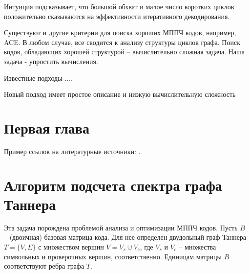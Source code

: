 \documentclass[specification,annotation,times]{itmo-student-thesis}
\begin{document}

\tableofcontents

\startprefacepage

Интуиция подсказывает, что большой обхват и 
малое число коротких циклов положительно сказываются на эффективности 
итеративного декодирования.

Существуют и другие критерии для поиска хороших МППЧ кодов, например, ACE. 
В любом случае, все сводится к анализу структуры циклов графа. 
Поиск кодов, обладающих хорошей  структурой -- вычислительно сложная задача.
Наша задача - упростить вычисления. 

Известные подходы ....

Новый подход имеет простое описание и низкую вычислительную сложность

\chapter{Первая глава}

Пример ссылок на литературные источники: \cite{hall-combinatorics,kudryashov-codingtheory,finding-and-counting-given-length-cycles,counting-short-cycles-of-quasi-cyclic-protograph-ldpc-codes,message-passing-algorithm-for-counting-short-cycles-in-graph,how-to-find-long-paths-efficiently,color-coding,algorithm-for-counting-for-counting-short-cycles-in-bipartite-graphs,opencl-cuda-algorithms-for-parallel-decoding-of-any-irregular-ldpc-code-using-gpu,stressing-the-ber-simulation-of-ldpc-codes-in-the-error-floor-region-using-gpu-clusters,on-the-number-of-cycles-in-a-graph,understanding-belief-propogation,mackay-codes}.

\chapter{Алгоритм подсчета спектра графа Таннера}

Эта задача порождена проблемой анализа и оптимизации МППЧ кодов. 
Пусть $B$  -- (двоичная) базовая матрица кода.
Для нее определен двудольный граф Таннера $T=\{V, E \}$ с множеством вершин 
$V= V_s \cup V_c$, где  $V_s$ и  $V_c$ -- множества символьных и проверочных вершин, 
соответственно. Единицам  матрицы $B$ соответствуют ребра графа $T$. 
\end{document}
